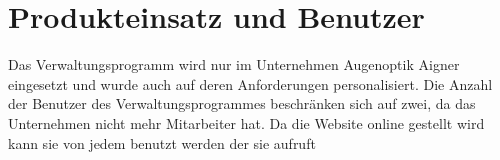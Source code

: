 \section{Produkteinsatz und Benutzer}
Das Verwaltungsprogramm wird nur im Unternehmen Augenoptik Aigner eingesetzt und wurde auch auf deren Anforderungen personalisiert. Die Anzahl der Benutzer des Verwaltungsprogrammes beschränken sich auf zwei, da das Unternehmen nicht mehr Mitarbeiter hat.
Da die Website online gestellt wird kann sie von jedem benutzt werden der sie aufruft



